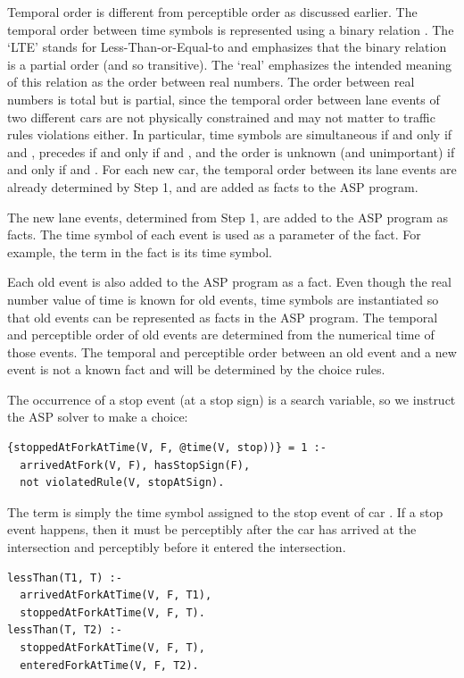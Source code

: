 Temporal order is different from perceptible order as discussed earlier.
%
The temporal order between time symbols is represented using a binary relation .
%
The `LTE' stands for Less-Than-or-Equal-to and emphasizes that the binary relation is a partial order (and so transitive).
%
The `real' emphasizes the intended meaning of this relation as the order between real numbers.
%
The order between real numbers is total but   is partial, since the temporal order between lane events of two different cars are not physically constrained and may not matter to traffic rules violations either.
%
In particular, time symbols  are simultaneous if and only if
 and ,  precedes  if and only if 
 and , and the order is unknown (and unimportant) if and only if  and .
%
For each new car, the temporal order between its lane events are already determined by Step 1, and are added as facts to the ASP program.

The new lane events, determined from Step 1, are added to the ASP program as facts.
%
The time symbol of each event is used as a parameter of the fact.
%
For example, the term  in the fact
 is its time symbol.


Each old event is also added to the ASP program as a fact.
%
Even though the real number value of time is known for old events, time symbols are instantiated so that old events can be represented as facts in the ASP program.
%
The temporal and perceptible order of old events are determined from the numerical time of those events.
%
The temporal and perceptible order between an old event and a new event is not a known fact and will be determined by the choice rules.


The occurrence of a stop event (at a stop sign) is a search variable, so we instruct the ASP solver to make a choice:
\begin{verbatim}
{stoppedAtForkAtTime(V, F, @time(V, stop))} = 1 :-
  arrivedAtFork(V, F), hasStopSign(F),
  not violatedRule(V, stopAtSign).
\end{verbatim}
%
The term  is simply the time symbol assigned to the stop event of car .
%
If a stop event happens, then it must be perceptibly after the car has arrived at the intersection and perceptibly before it entered the intersection.
\begin{verbatim}
lessThan(T1, T) :-  
  arrivedAtForkAtTime(V, F, T1),
  stoppedAtForkAtTime(V, F, T).
lessThan(T, T2) :-
  stoppedAtForkAtTime(V, F, T),  
  enteredForkAtTime(V, F, T2).
\end{verbatim}



